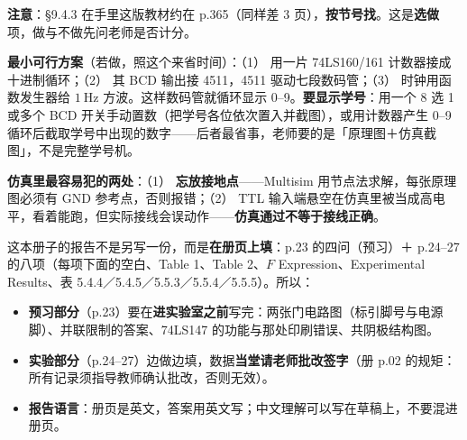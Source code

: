 \documentclass[11pt]{ctexart}
\let\orighdr\hdr
\renewcommand{\hdr}[2]{\needspace{10\baselineskip}\orighdr{#1}{#2}}
\let\origsubhdr\subhdr
\renewcommand{\subhdr}[1]{\needspace{3\baselineskip}\origsubhdr{#1}}
\begin{document}
\textbf{注意}：§9.4.3 在手里这版教材约在 p.365（同样差 3 页），\textbf{按节号找}。这是\textbf{选做}项，做与不做先问老师是否计分。

\textbf{最小可行方案}（若做，照这个来省时间）：（1） 用一片 74LS160/161 计数器接成十进制循环；（2） 其 BCD 输出接 4511，4511 驱动七段数码管；（3） 时钟用函数发生器给 $1\ \mathrm{Hz}$ 方波。这样数码管就循环显示 0--9。\textbf{要显示学号}：用一个 8 选 1 或多个 BCD 开关手动置数（把学号各位依次置入并截图），或用计数器产生 0--9 循环后截取学号中出现的数字——后者最省事，老师要的是「原理图＋仿真截图」，不是完整学号机。

\textbf{仿真里最容易犯的两处}：（1） \textbf{忘放接地点}——Multisim 用节点法求解，每张原理图必须有 GND 参考点，否则报错；（2） TTL 输入端悬空在仿真里被当成高电平，看着能跑，但实际接线会误动作——\textbf{仿真通过不等于接线正确}。

\label{sec:4}


这本册子的报告不是另写一份，而是\textbf{在册页上填}：p.23 的四问（预习）＋ p.24--27 的八项（每项下面的空白、Table 1、Table 2、$F$ Expression、Experimental Results、表 5.4.4／5.4.5／5.5.3／5.5.4／5.5.5）。所以：

\begin{itemize}
  \item \textbf{预习部分}（p.23）要在\textbf{进实验室之前}写完：两张门电路图（标引脚号与电源脚）、并联限制的答案、74LS147 的功能与那处印刷错误、共阴极结构图。
  \item \textbf{实验部分}（p.24--27）边做边填，数据\textbf{当堂请老师批改签字}（册 p.02 的规矩：所有记录须指导教师确认批改，否则无效）。
  \item \textbf{报告语言}：册页是英文，答案用英文写；中文理解可以写在草稿上，不要混进册页。
\end{itemize}

\end{document}
